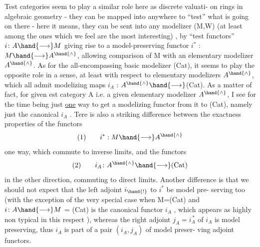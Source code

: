 
Test categories seem to play a similar role here as  discrete valuati-%
on rings in algebraic geometry -  they can be mapped into anywhere\hand{,} to
``test'' what is going on there  -  here it means,  they can be sent into
any modelizer (M,W)  (at least among the ones which we feel are the most
interesting) ,  by  ``test functors''  $i\colon A\hand{\longrightarrow} M$  giving rise to
a model-preserving functor  $i^{*}$ :  $M\hand{\longrightarrow} A^{\hand{\wedge}}$,  allowing comparison of M with
an elementary modelizer $A^{\hand{\wedge}}$.  As for the all-encompassing basic modelizer
(Cat),  it seems to play the opposite role in a sense,  at least with
respect to elementary modelizers\xout{\unsure{,}} $A^{\hand{\wedge}}$,  which all admit modelizing maps
$i_A$ :  $A^{\hand{\wedge}}\hand{\longrightarrow}$(Cat).  As a matter of fact,  for given est category A i.e.
a given elementary modelizer $A^{\hand{\wedge}}$,  I see for the time being just \uline{one} way
to get a modelizing functor from it to (Cat),  namely just the canonical
$i_A$ .  Tere is also a striking difference between the exactness properties
of the functors
\[ \text{(1)}\qquad i^{*} : M\hand{\longrightarrow} A^{\hand{\wedge}} \]
one way,  which commute to inverse limits,  and the functors
\[ \text{(2)}\qquad i_A\colon A^{\hand{\wedge}}\hand{\longrightarrow}\text{(Cat)} \]
in the other direction,  commuting to direct limits.  Another difference
is that we should not expect that the left adjoint  $i_{\hand{!}}$ to $i^{*}$ be model pre-%
serving too (with the exception of the very special case when M=(Cat) and
$i\colon A\hand{\longrightarrow} M$ = (Cat)  is the canonical functor $i_A$ ,  which appears as highly
non typical in this respect ),  whereas the right adjoint  $j_A=i_A^{\,*}$  of $i_A$
is model preserving,  thus $i_A$ is part of a pair $(i_A,j_A)$ of model preser-%
ving adjoint functors.

